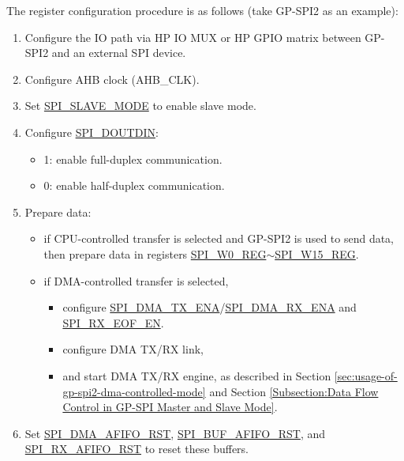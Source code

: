 \documentclass[main\_\_EN.tex]{subfiles}
\begin{document}
The register configuration procedure is as follows (take GP-SPI2 as an example):
\begin{enumerate}
    \item Configure the IO path via HP IO MUX or HP GPIO matrix between GP-SPI2 and an external SPI device.

    \item Configure AHB clock (AHB\_CLK).

    \item Set \hyperref[fielddesc:SPISLAVEMODE]{SPI\_SLAVE\_MODE} to enable slave mode.

    \item Configure \hyperref[fielddesc:SPIDOUTDIN]{SPI\_DOUTDIN}:
    \begin{itemize}
        \item 1: enable full-duplex communication.
        \item 0: enable half-duplex communication.
    \end{itemize}

    \item Prepare data:
    \begin{itemize}
        \item if CPU-controlled transfer is selected and GP-SPI2 is used to send data, then prepare data in registers \hyperref[regdesc:SPIW0REG]{SPI\_W0\_REG}$\sim$\hyperref[regdesc:SPIW15REG]{SPI\_W15\_REG}.
        \item if DMA-controlled transfer is selected,
        \begin{itemize}
            \item configure \hyperref[fielddesc:SPIDMATXENA]{SPI\_DMA\_TX\_ENA}/\hyperref[fielddesc:SPIDMARXENA]{SPI\_DMA\_RX\_ENA} and \hyperref[fielddesc:SPIRXEOFEN]{SPI\_RX\_EOF\_EN}.
            \item configure DMA TX/RX link,
            \item and start DMA TX/RX engine, as described in Section \ref{sec:usage-of-gp-spi2-dma-controlled-mode} and Section \ref{Subsection:Data Flow Control in GP-SPI Master and Slave Mode}.
        \end{itemize}
    \end{itemize}

    \item Set \hyperref[fielddesc:SPIDMAAFIFORST]{SPI\_DMA\_AFIFO\_RST}, \hyperref[fielddesc:SPIBUFAFIFORST]{SPI\_BUF\_AFIFO\_RST}, and \hyperref[fielddesc:SPIRXAFIFORST]{SPI\_RX\_AFIFO\_RST} to reset these buffers.


\end{enumerate}
\end{document}
